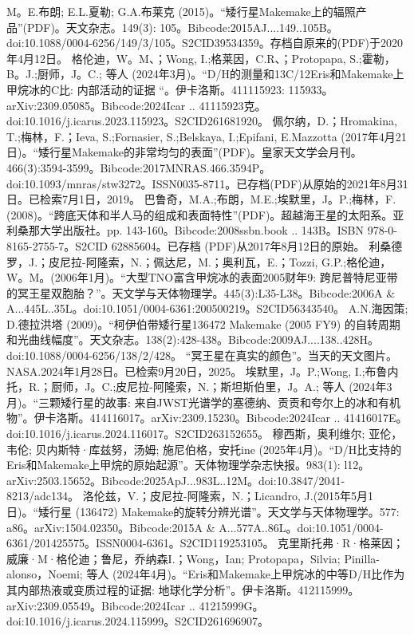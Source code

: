 \begin{enumerate}
 M。E.布朗; E.L.夏勒; G.A.布莱克 (2015)。“矮行星Makemake上的辐照产品”(PDF)。天文杂志。149(3): 105。Bibcode:2015AJ....149..105B。doi:10.1088/0004-6256/149/3/105。S2CID39534359。存档自原来的(PDF)于2020年4月12日。  
 格伦迪，W。M、；Wong, I.;格莱因，C.R、；Protopapa, S.;霍勒，B。J.;厨师，J。C.; 等人 (2024年3月)。“D/H的测量和13C/12Eris和Makemake上甲烷冰的C比: 内部活动的证据 “。伊卡洛斯。411115923: 115933。arXiv:2309.05085。Bibcode:2024Icar .. 41115923克。doi:10.1016/j.icarus.2023.115923。S2CID261681920。 
 佩尔纳，D.；Hromakina, T.;梅林，F.；Ieva, S.;Fornasier, S.;Belskaya, I.;Epifani, E.Mazzotta (2017年4月21日)。“矮行星Makemake的非常均匀的表面”(PDF)。皇家天文学会月刊。466(3):3594-3599。Bibcode:2017MNRAS.466.3594P。doi:10.1093/mnras/stw3272。ISSN0035-8711。已存档(PDF)从原始的2021年8月31日。已检索7月1日，2019。  
 巴鲁奇，M.A.;布朗，M.E.;埃默里，J。P.;梅林，F.(2008)。“跨底天体和半人马的组成和表面特性”(PDF)。超越海王星的太阳系。亚利桑那大学出版社。pp. 143-160。Bibcode:2008ssbn.book .. 143B。ISBN  978-0-8165-2755-7。S2CID 62885604。已存档 (PDF)从2017年8月12日的原始。
 利桑德罗，J.；皮尼拉-阿隆索，N.；佩达尼，M.；奥利瓦，E.；Tozzi, G.P.;格伦迪，W。M。(2006年1月)。“大型TNO富含甲烷冰的表面2005财年9: 跨尼普特尼亚带的冥王星双胞胎？”。天文学与天体物理学。445(3):L35-L38。Bibcode:2006A & A...445L..35L。doi:10.1051/0004-6361:200500219。S2CID56343540。  
 A.N.海因策; D.德拉洪塔 (2009)。“柯伊伯带矮行星136472 Makemake (2005 FY9) 的自转周期和光曲线幅度”。天文杂志。138(2):428-438。Bibcode:2009AJ....138..428H。doi:10.1088/0004-6256/138/2/428。
 “冥王星在真实的颜色”。当天的天文图片。NASA.2024年1月28日。已检索9月20日，2025。
 埃默里，J。P.;Wong, I.;布鲁内托，R.；厨师，J。C.;皮尼拉-阿隆索，N.；斯坦斯伯里，J。A.; 等人 (2024年3月)。“三颗矮行星的故事: 来自JWST光谱学的塞德纳、贡贡和夸尔上的冰和有机物”。伊卡洛斯。414116017。arXiv:2309.15230。Bibcode:2024Icar .. 41416017E。doi:10.1016/j.icarus.2024.116017。S2CID263152655。 
 穆西斯，奥利维尔; 亚伦，韦伦; 贝内斯特·库兹努，汤姆; 施尼伯格，安托ine (2025年4月)。“D/H比支持的Eris和Makemake上甲烷的原始起源”。天体物理学杂志快报。983(1): l12。arXiv:2503.15652。Bibcode:2025ApJ...983L..12M。doi:10.3847/2041-8213/adc134。
 洛伦兹，V.；皮尼拉-阿隆索，N.；Licandro, J.(2015年5月1日)。“矮行星 (136472) Makemake的旋转分辨光谱”。天文学与天体物理学。577: a86。arXiv:1504.02350。Bibcode:2015A & A...577A..86L。doi:10.1051/0004-6361/201425575。ISSN0004-6361。S2CID119253105。  
 克里斯托弗·R·格莱因；威廉·M·格伦迪；鲁尼，乔纳森I.；Wong，Ian; Protopapa，Silvia; Pinilla-alonso，Noemi; 等人 (2024年4月)。“Eris和Makemake上甲烷冰的中等D/H比作为其内部热液或变质过程的证据: 地球化学分析”。伊卡洛斯。412115999。arXiv:2309.05549。Bibcode:2024Icar .. 41215999G。doi:10.1016/j.icarus.2024.115999。S2CID261696907。 

\end{enumerate}
